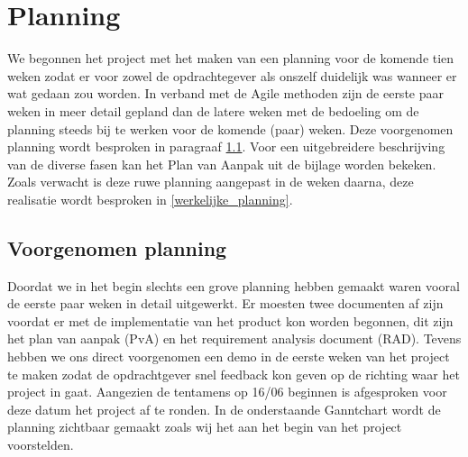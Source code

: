 \section{Planning}
\label{Planning}

We begonnen het project met het maken van een planning voor de komende tien
weken zodat er voor zowel de opdrachtegever als onszelf duidelijk was wanneer
er wat gedaan zou worden. In verband met de Agile methoden zijn de eerste paar
weken in meer detail gepland dan de latere weken met de bedoeling om de
planning steeds bij te werken voor de komende (paar) weken. Deze voorgenomen
planning wordt besproken in paragraaf \ref{voorgenomen_planning}. Voor een
uitgebreidere beschrijving van de diverse fasen kan het Plan van Aanpak uit de
bijlage worden bekeken. Zoals verwacht is deze ruwe planning aangepast in de
weken daarna, deze realisatie wordt besproken in \ref{werkelijke_planning}.

\subsection{Voorgenomen planning}
\label{voorgenomen_planning}

Doordat we in het begin slechts een grove planning hebben gemaakt waren vooral
de eerste paar weken in detail uitgewerkt. Er moesten twee documenten af zijn
voordat er met de implementatie van het product kon worden begonnen, dit zijn
het plan van aanpak (PvA) en het requirement analysis document (RAD). Tevens
hebben we ons direct voorgenomen een demo in de eerste weken van het project te
maken zodat de opdrachtgever snel feedback kon geven op de richting waar het
project in gaat.
Aangezien de tentamens op 16/06 beginnen is afgesproken
voor deze datum het project af te ronden. In de onderstaande Ganntchart wordt
de planning zichtbaar gemaakt zoals wij het aan het begin van het project
voorstelden.

